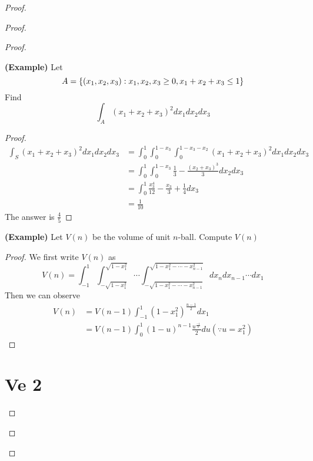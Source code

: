 \documentclass{report}
\begin{document}
\begin{proof}
\begin{proof}
\begin{proof}
\begin{theorem}
\label{6.6.4}
\textbf{(Example)} Let 
\begin{equation}
A=\{ (x_1,x_2,x_3):x_1,x_2,x_3 \geq 0, x_1+x_2+x_3\leq 1 \}
\end{equation}
Find
\begin{equation}
\int_A (x_1+x_2+x_3)^2 dx_1dx_2dx_3
\end{equation}
\end{theorem}
\begin{proof}
\begin{align}
\int_S(x_1+x_2+x_3)^2dx_1dx_2dx_3&=\int_0^1 \int_0^{1-x_3}\int_0^{1-x_3-x_2}(x_1+x_2+x_3)^2dx_1dx_2dx_3\\
&=\int_0^1\int_0^{1-x_3}\frac{1}{3}-\frac{(x_2+x_3)^3}{3}dx_2dx_3\\
&=\int_0^1 \frac{x_3^4}{12}-\frac{x_3}{3}+\frac{1}{4}dx_3\\
&=\frac{1}{10}
\end{align}
The answer is $\frac{4}{5}$
\end{proof}
\begin{theorem}
\label{6.6.5}
\textbf{(Example)} Let $V(n)$ be the volume of unit $n$-ball. Compute $V(n)$
\end{theorem}
\begin{proof}
We first write $V(n)$ as
 \begin{equation}
V(n)=\int_{-1}^1\int_{-\sqrt{1-x_1^2}}^{\sqrt{1-x_1^2}}\cdots \int^{\sqrt{1-x_1^2-\cdots -x_{n-1}^2} }_{-\sqrt{1-x_1^2-\cdots -x_{n-1}^2} }dx_ndx_{n-1}\cdots dx_1
\end{equation}
Then we can observe
\begin{align}
  V(n)&=V(n-1)\int_{-1}^1 (1-x_1^2)^{\frac{n-1}{2}}dx_1\\
  &=V(n-1)\int_0^1 (1-u)^{n-1}\frac{u^{\frac{-1}{2}}}{2}du (\because u=x_1^2)
\end{align}
\end{proof}
\chapter{Ve 2}

\end{proof}
\end{proof}
\end{proof}
\end{document}
